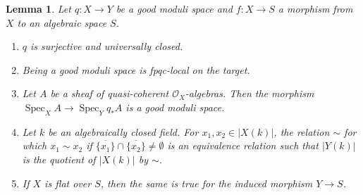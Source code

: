 \documentclass[a4paper,twoside,11pt]{amsart}
\theoremstyle{plain}
\newtheorem{lemma}[theorem]{Lemma}
\theoremstyle{definition}
\theoremstyle{remark}
\numberwithin{equation}{section}
\DeclareMathOperator{\Spec}{Spec} %
\newcommand{\oO}{\mathcal{O}}
\begin{document}
\begin{lemma} \label{lem:gms_prop}
    Let $q \colon X \to Y$ be a good moduli space and $f \colon X \to S$ a morphism from $X$ to an algebraic space $S$.
    \begin{enumerate}
        \item $q$ is surjective and universally closed.
        \item Being a good moduli space is fpqc-local on the target. 
        \item Let $A$ be a sheaf of quasi-coherent $\oO_X$-algebras. Then the morphism $\Spec_X A \to \Spec_Y q_*A$ is a good moduli space.
        \item Let $k$ be an algebraically closed field. For $x_1,x_2 \in \lvert X(k) \rvert$, the relation $\sim$ for which $x_1 \sim x_2$ if $\overline{\{x_1\}} \cap \overline{\{x_2\}} \neq \emptyset$ is an equivalence relation such that $\lvert Y(k) \rvert$ is the quotient of $\lvert X(k) \rvert$ by $\sim$. 
        \item If $X$ is flat over $S$, then the same is true for the induced morphism $Y \to S$.
    \end{enumerate}
\end{lemma}
\end{document}
